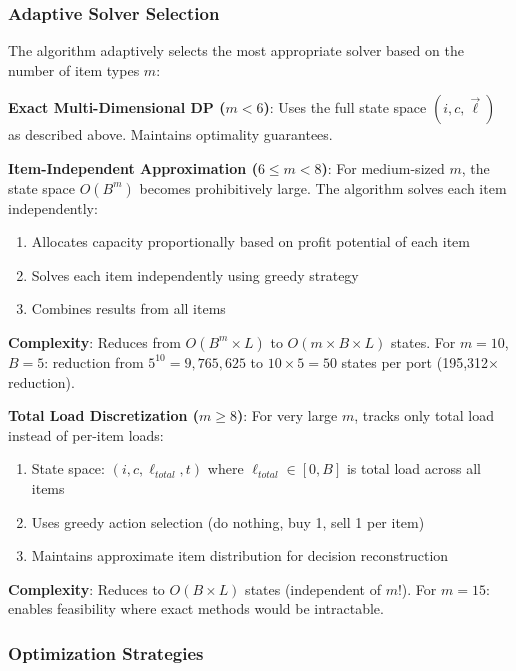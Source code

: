 \documentclass[12pt]{article}
\begin{document}
\subsubsection{Adaptive Solver Selection}

The algorithm adaptively selects the most appropriate solver based on the number of item types $m$:

\textbf{Exact Multi-Dimensional DP ($m < 6$)}: Uses the full state space $(i, c, \vec{\ell})$ as described above. Maintains optimality guarantees.

\textbf{Item-Independent Approximation ($6 \leq m < 8$)}: For medium-sized $m$, the state space $O(B^m)$ becomes prohibitively large. The algorithm solves each item independently:
\begin{enumerate}
    \item Allocates capacity proportionally based on profit potential of each item
    \item Solves each item independently using greedy strategy
    \item Combines results from all items
\end{enumerate}
\textbf{Complexity}: Reduces from $O(B^m \times L)$ to $O(m \times B \times L)$ states. For $m=10$, $B=5$: reduction from $5^{10} = 9,765,625$ to $10 \times 5 = 50$ states per port (195,312$\times$ reduction).

\textbf{Total Load Discretization ($m \geq 8$)}: For very large $m$, tracks only total load instead of per-item loads:
\begin{enumerate}
    \item State space: $(i, c, \ell_{total}, t)$ where $\ell_{total} \in [0, B]$ is total load across all items
    \item Uses greedy action selection (do nothing, buy 1, sell 1 per item)
    \item Maintains approximate item distribution for decision reconstruction
\end{enumerate}
\textbf{Complexity}: Reduces to $O(B \times L)$ states (independent of $m$!). For $m=15$: enables feasibility where exact methods would be intractable.

\subsubsection{Optimization Strategies}
\end{document}
